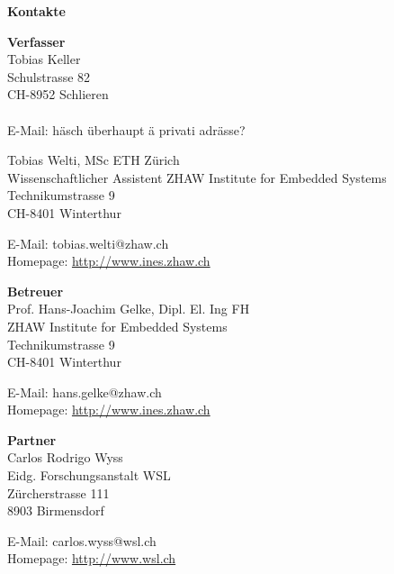 %
%

{\large\textbf{Kontakte}}\vskip 15pt

\textbf{Verfasser} \\
Tobias Keller \\
Schulstrasse 82\\
CH-8952 Schlieren\\
\\
E-Mail: häsch überhaupt ä privati adrässe?\vskip 15pt

Tobias Welti, MSc ETH Zürich\\
Wissenschaftlicher Assistent
ZHAW Institute for Embedded Systems\\
Technikumstrasse 9\\
CH-8401 Winterthur

E-Mail: tobias.welti@zhaw.ch\\
Homepage: \url{http://www.ines.zhaw.ch}\vskip 15pt

\textbf{Betreuer} \\
Prof. Hans-Joachim Gelke, Dipl. El. Ing FH\\
ZHAW Institute for Embedded Systems\\
Technikumstrasse 9\\
CH-8401 Winterthur

E-Mail: hans.gelke@zhaw.ch\\
Homepage: \url{http://www.ines.zhaw.ch}\vskip 15pt

\textbf{Partner} \\
Carlos Rodrigo Wyss\\
Eidg. Forschungsanstalt WSL\\
Zürcherstrasse 111\\
8903 Birmensdorf

E-Mail: carlos.wyss@wsl.ch\\
Homepage: \url{http://www.wsl.ch}\vskip 15pt